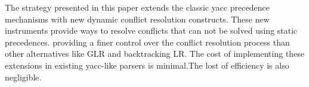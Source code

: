 
The strategy presented in this paper
extends the classic yacc precedence mechanisms
with new dynamic conflict resolution constructs.
These new instruments provide ways to resolve conflicts
that can not be solved using static precedences.
providing a
finer control over the conflict resolution process
than other alternatives like GLR and backtracking LR.
The cost of implementing these extensions in existing yacc-like 
parsers is minimal.The lost of efficiency is also negligible.

